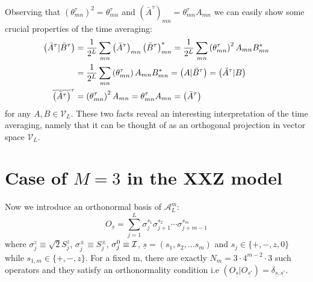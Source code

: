 Observing that \(\left(\theta_{mn}^{\tau}\right)^2 = \theta_{mn}^{\tau}\) and \(\left(\bar{A}^{\tau}\right)_{mn} = 
\theta_{mn}^{\tau} A_{mn}\) we can easily show some crucial properties of the time averaging:
\begin{align}
   \left(\bar{A}^{\tau}|\bar{B}^{\tau}\right) &= \frac{1}{2^L} \sum_{mn} \left(\bar{A}^{\tau}\right)_{mn} 
  \left(\bar{B}^{\tau}\right)_{mn}^{\ast} = \frac{1}{2^L} \sum_{mn} \left(\theta_{mn}^{\tau}\right)^2 A_{mn} B_{mn}^{\ast} \nonumber\\
  &= \frac{1}{2^L} \sum_{mn} \left(\theta_{mn}^{\tau}\right) A_{mn} B_{mn}^{\ast} = 
  \left(A|\bar{B}^{\tau}\right) = \left(\bar{A}^{\tau}|B\right) \\
  \overline{\left(\bar{A}^{\tau}\right)}^{\tau} &= \left(\theta_{mn}^{\tau}\right)^2 A_{mn} = \theta_{mn}^{\tau} A_{mn} = \left(\bar{A}^{\tau}\right)
\end{align}
for any \(A,B \in \mathcal{V}_L\). These two facts reveal an interesting interpretation of the time averaging, namely that it can be
thought of as an orthogonal projection in vector space \(\mathcal{V}_L\).
  
  \section{Case of \(M = 3\) in the XXZ model}
  Now we introduce an orthonormal basis of \({\mathcal{A}_L^m}\):
  \begin{equation}
      O_{\underline{s} } = \sum_{j = 1}^L \sigma_{j}^{s_1}\sigma_{j+1}^{s_2}\cdots \sigma_{j+m-1}^{s_m}
  \end{equation}
  where \(\sigma^z_j \equiv \sqrt{2}S^{z}_j\), \(\sigma^{\pm}_j \equiv S^{\pm}_j\), \(\sigma^0_j\equiv \mathcal{I}\), \(\underline{s} = (s_1,s_2,\ldots s_m)\)
  and \(s_j \in \{+,-,z,0\}\) while \(s_{1,m} \in \{+,-,z\}\). For a fixed m, there are exactly \(N_m = 3\cdot 4^{m-2}\cdot 3\) such operators and they
  satisfy an orthonormality condition i.e \(\left(O_{\underline{s}}|O_{\underline{s'}}\right) = \delta_{\underline{s},\underline{s'}}\). 
  
